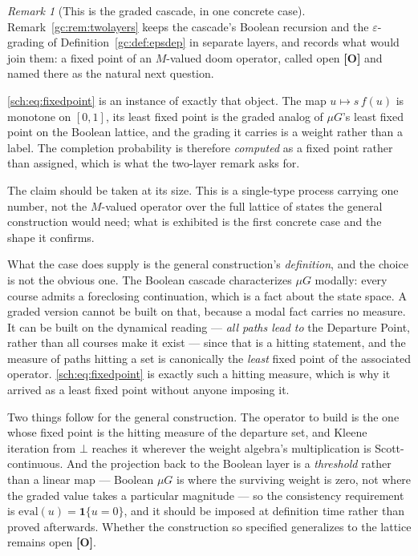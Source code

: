 \documentclass[11pt]{article}
\numberwithin{equation}{section}
\theoremstyle{plain}
\theoremstyle{definition}
\theoremstyle{remark}
\newtheorem{remark}[theorem]{Remark}
\newcommand{\one}{\mathbf{1}}
\begin{document}
\begin{remark}[This is the graded cascade, in one concrete case]
\label{sch:rem:mvalued}
Remark~\ref{gc:rem:twolayers} keeps the cascade's Boolean recursion and the
$\varepsilon$-grading of Definition~\ref{gc:def:epsdep} in separate
layers, and records what would join them: a fixed point of an
$M$-valued doom operator, called open \textbf{[O]} and named there as
the natural next question.

\eqref{sch:eq:fixedpoint} is an instance of exactly that object. The map
$u\mapsto s\,f(u)$ is monotone on $[0,1]$, its least fixed point is the
graded analog of $\mu G$'s least fixed point on the Boolean lattice,
and the grading it carries is a weight rather than a label. The
completion probability is therefore \emph{computed} as a fixed point
rather than assigned, which is what the two-layer remark asks for.

The claim should be taken at its size. This is a single-type process
carrying one number, not the $M$-valued operator over the full lattice
of states the general construction would need; what is exhibited is the
first concrete case and the shape it confirms.

What the case does supply is the general construction's
\emph{definition}, and the choice is not the obvious one. The Boolean
cascade characterizes $\mu G$ modally: every course admits a foreclosing
continuation, which is a fact about the state space. A graded version
cannot be built on that, because a modal fact carries no measure. It can
be built on the dynamical reading --- \emph{all paths lead to} the
Departure Point, rather than all courses make it exist --- since that is
a hitting statement, and the measure of paths hitting a set is
canonically the \emph{least} fixed point of the associated operator.
\eqref{sch:eq:fixedpoint} is exactly such a hitting measure, which is why
it arrived as a least fixed point without anyone imposing it.

Two things follow for the general construction. The operator to build is
the one whose fixed point is the hitting measure of the departure set,
and Kleene iteration from $\bot$ reaches it wherever the weight algebra's
multiplication is Scott-continuous. And the projection back to the
Boolean layer is a \emph{threshold} rather than a linear map --- Boolean
$\mu G$ is where the surviving weight is zero, not where the graded value
takes a particular magnitude --- so the consistency requirement is
$\mathrm{eval}(u)=\one\{u=0\}$, and it should be imposed at definition
time rather than proved afterwards. Whether the construction so specified
generalizes to the lattice remains open \textbf{[O]}.
\end{remark}
\end{document}
